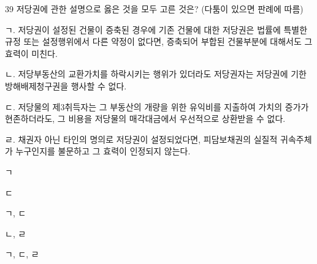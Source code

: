 \begin{question}{39}
저당권에 관한 설명으로 옳은 것을 모두 고른 것은? (다툼이 있으면 판례에 따름)
\begin{framedtext}
ㄱ. 저당권이 설정된 건물이 증축된 경우에 기존 건물에 대한 저당권은 법률에 특별한 규정 또는 설정행위에서 다른 약정이 없다면, 증축되어 부합된 건물부분에 대해서도 그 효력이 미친다. \par
ㄴ. 저당부동산의 교환가치를 하락시키는 행위가 있더라도 저당권자는 저당권에 기한 방해배제청구권을 행사할 수 없다. \par
ㄷ. 저당물의 제3취득자는 그 부동산의 개량을 위한 유익비를 지출하여 가치의 증가가 현존하더라도, 그 비용을 저당물의 매각대금에서 우선적으로 상환받을 수 없다. \par
ㄹ. 채권자 아닌 타인의 명의로 저당권이 설정되었다면, 피담보채권의 실질적 귀속주체가 누구인지를 불문하고 그 효력이 인정되지 않는다.
\end{framedtext}
\begin{choices}
  \item ㄱ
  \item ㄷ
  \item ㄱ, ㄷ
  \item ㄴ, ㄹ
  \item ㄱ, ㄷ, ㄹ
\end{choices}
\end{question}
